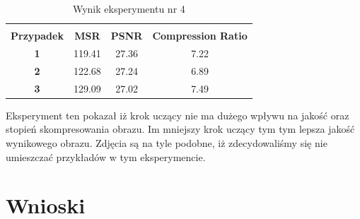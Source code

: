 \documentclass[12pt]{article}
\begin{document}
\begin{table}[h!]
 \caption{Wynik eksperymentu nr 4}
 \centering
 \vspace{0.2cm}
 \begin{tabular}{c c c c}
  \hline\hline\\[-0.4cm]
  \textbf{Przypadek} & \textbf{MSR} & \textbf{PSNR} & \textbf{Compression Ratio} \\[0.1cm]
  \textbf{1} & 119.41 & 27.36 & 7.22  \\
  \textbf{2} & 122.68 & 27.24 & 6.89  \\
  \textbf{3} & 129.09 & 27.02 & 7.49  \\ [0.1cm]
  \hline
 \end{tabular}
 \label{wynik eksperymentu 4}
\end{table}

Eksperyment ten pokazał iż krok uczący nie ma dużego wpływu na jakość oraz stopień skompresowania obrazu. Im mniejszy krok uczący tym tym lepsza jakość wynikowego obrazu. Zdjęcia są na tyle podobne, iż zdecydowaliśmy się nie umieszczać przykładów w tym eksperymencie.


\newpage
\section{Wnioski}
\end{document}
